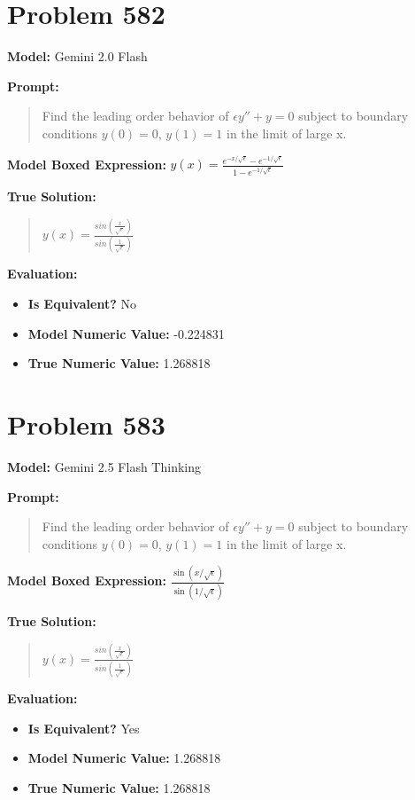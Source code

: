 \documentclass{article}
\begin{document}
\section*{Problem 582}
\textbf{Model:} Gemini 2.0 Flash

\textbf{Prompt:}
\begin{quote}
Find the leading order behavior of $\epsilon y'' + y = 0$ subject to boundary conditions $y(0) = 0$, $y(1) = 1$ in the limit of large x.
\end{quote}
\textbf{Model Boxed Expression:} $y(x) = \frac{e^{-x/\sqrt{\epsilon}} - e^{-1/\sqrt{\epsilon}}}{1 - e^{-1/\sqrt{\epsilon}}}$

\textbf{True Solution:}
\begin{quote}
$y(x) = \frac{sin(\frac{x}{\sqrt{\epsilon}})}{sin(\frac{1}{\sqrt{\epsilon}})}$
\end{quote}

\textbf{Evaluation:}
\begin{itemize}
\item \textbf{Is Equivalent?} No
\item \textbf{Model Numeric Value:} -0.224831
\item \textbf{True Numeric Value:} 1.268818
\end{itemize}
\vspace{1cm}
\section*{Problem 583}
\textbf{Model:} Gemini 2.5 Flash Thinking

\textbf{Prompt:}
\begin{quote}
Find the leading order behavior of $\epsilon y'' + y = 0$ subject to boundary conditions $y(0) = 0$, $y(1) = 1$ in the limit of large x.
\end{quote}
\textbf{Model Boxed Expression:} $\frac{\sin(x/\sqrt{\epsilon})}{\sin(1/\sqrt{\epsilon})}$

\textbf{True Solution:}
\begin{quote}
$y(x) = \frac{sin(\frac{x}{\sqrt{\epsilon}})}{sin(\frac{1}{\sqrt{\epsilon}})}$
\end{quote}

\textbf{Evaluation:}
\begin{itemize}
\item \textbf{Is Equivalent?} Yes
\item \textbf{Model Numeric Value:} 1.268818
\item \textbf{True Numeric Value:} 1.268818
\end{itemize}
\vspace{1cm}
\end{document}
